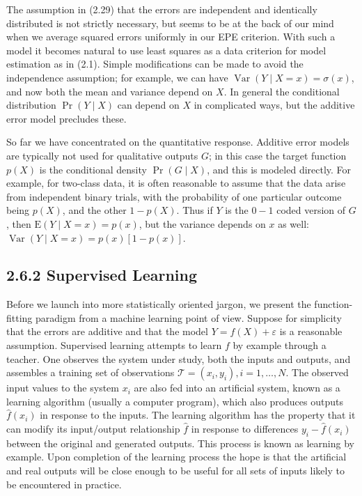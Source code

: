 \documentclass[10pt]{article}
\begin{document}
The assumption in (2.29) that the errors are independent and identically distributed is not strictly necessary, but seems to be at the back of our mind\\
when we average squared errors uniformly in our EPE criterion. With such a model it becomes natural to use least squares as a data criterion for model estimation as in (2.1). Simple modifications can be made to avoid the independence assumption; for example, we can have $\operatorname{Var}(Y \mid X=x)= \sigma(x)$, and now both the mean and variance depend on $X$. In general the conditional distribution $\operatorname{Pr}(Y \mid X)$ can depend on $X$ in complicated ways, but the additive error model precludes these.

So far we have concentrated on the quantitative response. Additive error models are typically not used for qualitative outputs $G$; in this case the target function $p(X)$ is the conditional density $\operatorname{Pr}(G \mid X)$, and this is modeled directly. For example, for two-class data, it is often reasonable to assume that the data arise from independent binary trials, with the probability of one particular outcome being $p(X)$, and the other $1-p(X)$. Thus if $Y$ is the $0-1$ coded version of $G$, then $\mathrm{E}(Y \mid X=x)=p(x)$, but the variance depends on $x$ as well: $\operatorname{Var}(Y \mid X=x)=p(x)[1-p(x)]$.

\subsection*{2.6.2 Supervised Learning}
Before we launch into more statistically oriented jargon, we present the function-fitting paradigm from a machine learning point of view. Suppose for simplicity that the errors are additive and that the model $Y=f(X)+\varepsilon$ is a reasonable assumption. Supervised learning attempts to learn $f$ by example through a teacher. One observes the system under study, both the inputs and outputs, and assembles a training set of observations $\mathcal{T}= \left(x_{i}, y_{i}\right), i=1, \ldots, N$. The observed input values to the system $x_{i}$ are also fed into an artificial system, known as a learning algorithm (usually a computer program), which also produces outputs $\hat{f}\left(x_{i}\right)$ in response to the inputs. The learning algorithm has the property that it can modify its input/output relationship $\hat{f}$ in response to differences $y_{i}-\hat{f}\left(x_{i}\right)$ between the original and generated outputs. This process is known as learning by example. Upon completion of the learning process the hope is that the artificial and real outputs will be close enough to be useful for all sets of inputs likely to be encountered in practice.
\end{document}
